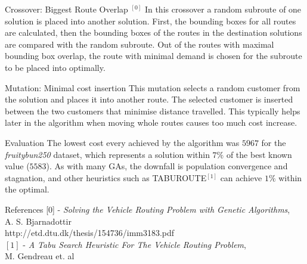 \documentclass[ %
                    author={Callum Mann},
                     title={Genetic algorithm for the CVRP},
                  subtitle={Capacitated Vehicle Routing Problem},
                      type={Heuristic},
                      year={2016}]{poster}
\begin{document}
\begin{frame}{}
\begin{columns}[t]
\begin{column}{0.450\linewidth}
    \vfill

    \begin{block}{\Large Crossover: Biggest Route Overlap $^{[0]}$}
      In this crossover a random subroute of one solution is placed into another
      solution. First, the bounding boxes for all routes are calculated, then
      the bounding boxes of the routes in the destination solutions are compared
      with the random subroute. Out of the routes with maximal bounding box overlap,
      the route with minimal demand is chosen for the subroute to be placed into optimally.
    \end{block}
    \vspace{1cm}

    \begin{block}{\Large Mutation: Minimal cost insertion}
      This mutation selects a random customer from the solution and places it into
      another route. The selected customer is inserted between the two customers
      that minimise distance travelled. This typically helps later in the
      algorithm when moving whole routes causes too much cost increase.
    \end{block}
    \vspace{1cm}

    \begin{block}{\Large Evaluation}
      The lowest cost every achieved by the algorithm was $5967$ for the \textit{fruitybun250}
      dataset, which represents a solution within $7\%$ of the best known value ($5583$). As with many GAs,
      the downfall is population convergence and stagnation, and other heuristics such as TABUROUTE$^{[1]}$
      can achieve $1\%$ within the optimal.
    \end{block}

    \begin{block}{\Large References}
      [0] - \textit{Solving the Vehicle Routing Problem with Genetic Algorithms}, \\ A. S. Bjarnadottir \\
      http://etd.dtu.dk/thesis/154736/imm3183.pdf \vspace{0.5cm} \\
      $[1]$ - \textit{A Tabu Search Heuristic For The Vehicle Routing Problem}, \\ M. Gendreau et. al
    \end{block}
    \vspace{1cm}
  \end{column}
\end{columns}

\vfill

\end{frame}

\end{document}
